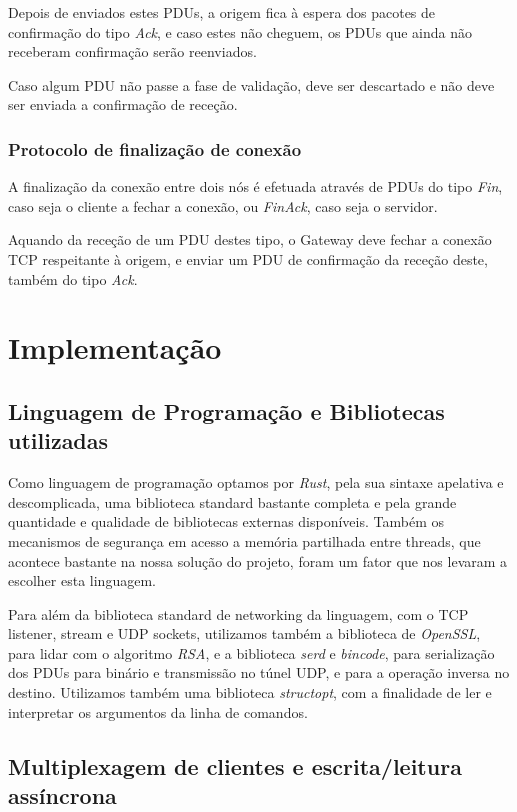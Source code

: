 \documentclass[a4paper]{report}
\begin{document}
Depois de enviados estes PDUs, a origem fica à espera dos pacotes de confirmação
do tipo \textit{Ack}, e caso estes não cheguem, os PDUs que ainda não receberam
confirmação serão reenviados.

Caso algum PDU não passe a fase de validação, deve ser descartado e não deve
ser enviada a confirmação de receção.

\subsection{Protocolo de finalização de conexão}

A finalização da conexão entre dois nós é efetuada através de PDUs do tipo
\textit{Fin}, caso seja o cliente a fechar a conexão, ou \textit{FinAck},
caso seja o servidor.

Aquando da receção de um PDU destes tipo, o Gateway deve fechar a conexão TCP
respeitante à origem, e enviar um PDU de confirmação da receção deste, também
do tipo \textit{Ack}.

\chapter{Implementação}

\section{Linguagem de Programação e Bibliotecas utilizadas}

Como linguagem de programação optamos por \textit{Rust}, pela sua sintaxe
apelativa e descomplicada, uma biblioteca standard bastante completa e pela
grande quantidade e qualidade de bibliotecas externas disponíveis. Também
os mecanismos de segurança em acesso a memória partilhada entre threads,
que acontece bastante na nossa solução do projeto, foram um fator que nos
levaram a escolher esta linguagem.

Para além da biblioteca standard de networking da linguagem, com o TCP
listener, stream e UDP sockets, utilizamos também a biblioteca de 
\textit{OpenSSL}, para lidar com o algoritmo \textit{RSA}, e a biblioteca
\textit{serd} e \textit{bincode}, para serialização dos PDUs para binário
e transmissão no túnel UDP, e para a operação inversa no destino. Utilizamos
também uma biblioteca \textit{structopt}, com a finalidade de ler e interpretar 
os argumentos da linha de comandos.

\section{Multiplexagem de clientes e escrita/leitura assíncrona}
\end{document}
